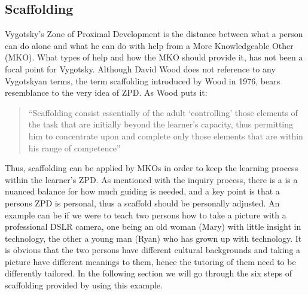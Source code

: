 \subsection{Scaffolding}
Vygotsky’s Zone of Proximal Development is the distance between what a person can do alone and what he can do with help from a More Knowledgeable Other (MKO). What types of help and how the MKO should provide it, has not been a focal point for Vygotsky. Although David Wood does not reference to any Vygotskyan terms, the term scaffolding introduced by Wood in 1976, bears resemblance to the very idea of ZPD. As Wood puts it:

\begin{quote}“Scaffolding consist essentially of the adult ‘controlling’ those elements of the task that are initially beyond the learner’s capacity, thus permitting him to concentrate upon and complete only those elements that are within his range of competence” \citep{wood1976role}
\end{quote}

Thus, scaffolding can be applied by MKOs in order to keep the learning process within the learner’s ZPD. As mentioned with the inquiry process, there is a is a nuanced balance for how much guiding is needed, and a key point is that a persons ZPD is personal, thus a scaffold should be personally adjusted. An example can be if we were to teach two persons how to take a picture with a professional DSLR camera, one being an old woman (Mary) with little insight in technology, the other a young man (Ryan) who has grown up with technology. It is obvious that the two persons have different cultural backgrounds and taking a picture have different meanings to them, hence the tutoring of them need to be differently tailored. In the following section we will go through the six steps of scaffolding provided by \citet{wood1976role} using this example.

